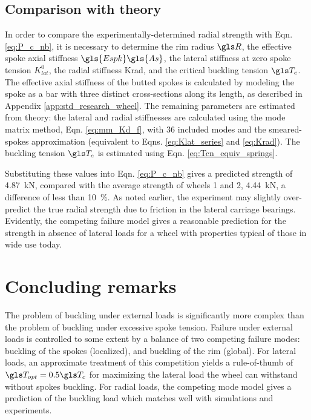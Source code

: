 \documentclass[\rootdir/thesis.tex]{subfiles}
\begin{document}
\subsection{Comparison with theory}
In order to compare the experimentally-determined radial strength with Eqn. \eqref{eq:P_c_nb}, it is necessary to determine the rim radius $\R$, the effective spoke axial stiffness $\gls{Espk}\gls{As}$, the lateral stiffness at zero spoke tension $K_{lat}^0$, the radial stiffness \gls{Krad}, and the critical buckling tension $\T_c$. The effective axial stiffness of the butted spokes is calculated by modeling the spoke as a bar with three distinct cross-sections along its length, as described in Appendix \ref{app:std_research_wheel}. The remaining parameters are estimated from theory: the lateral and radial stiffnesses are calculated using the mode matrix method, Eqn. \eqref{eq:mm_Kd_f}, with 36 included modes and the smeared-spokes approximation (equivalent to Eqns. \eqref{eq:Klat_series} and \eqref{eq:Krad}). The buckling tension $\T_c$ is estimated using Eqn. \eqref{eq:Tcn_equiv_springs}.

Substituting these values into Eqn. \eqref{eq:P_c_nb} gives a predicted strength of \SI{4.87}{kN}, compared with the average strength of wheels 1 and 2, \SI{4.44}{kN}, a difference of less than \SI{10}{\percent}. As noted earlier, the experiment may slightly over-predict the true radial strength due to friction in the lateral carriage bearings. Evidently, the competing failure model gives a reasonable prediction for the strength in absence of lateral loads for a wheel with properties typical of those in wide use today.

\section{Concluding remarks}

The problem of buckling under external loads is significantly more complex than the problem of buckling under excessive spoke tension. Failure under external loads is controlled to some extent by a balance of two competing failure modes: buckling of the spokes (localized), and buckling of the rim (global). For lateral loads, an approximate treatment of this competition yields a rule-of-thumb of $\T_{opt} = 0.5\T_c$ for maximizing the lateral load the wheel can withstand without spokes buckling. For radial loads, the competing mode model gives a prediction of the buckling load which matches well with simulations and experiments.
\end{document}
